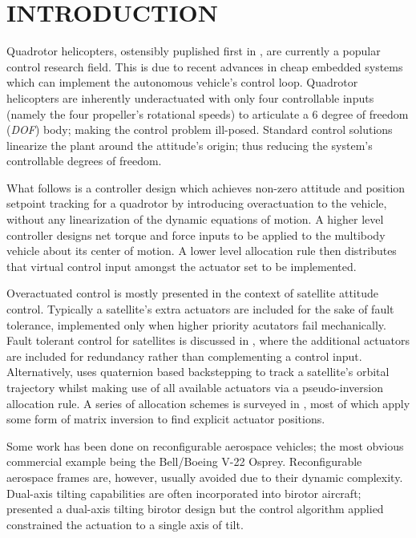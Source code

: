 \documentclass[a4paper, 10pt, conference]{ieeeconf}
\begin{document}
\section{INTRODUCTION}
Quadrotor helicopters, ostensibly puplished first in \cite{x4flyer}, are currently a popular control research field. This is due to recent advances in cheap embedded systems which can implement the autonomous vehicle's control loop. Quadrotor helicopters are inherently underactuated with only four controllable inputs (namely the four propeller's rotational speeds) to articulate a 6 degree of freedom (\emph{DOF}) body; making the control problem ill-posed. Standard control solutions linearize the plant around the attitude's origin; thus reducing the system's controllable degrees of freedom. 
\par
What follows is a controller design which achieves non-zero attitude and position setpoint tracking for a quadrotor by introducing overactuation to the vehicle, without any linearization of the dynamic equations of motion. A higher level controller designs net torque and force inputs to be applied to the multibody vehicle about its center of motion. A lower level allocation rule then distributes that virtual control input amongst the actuator set to be implemented.
\par
Overactuated control is mostly presented in the context of satellite attitude control. Typically a satellite's extra actuators are included for the sake of fault tolerance, implemented only when higher priority acutators fail mechanically. Fault tolerant control for satellites is discussed in \cite{ftcallocation}, where the additional actuators are included for redundancy rather than complementing a control input. Alternatively, \cite{quaternionbackstep} uses quaternion based backstepping to track a satellite's orbital trajectory whilst making use of all available actuators via a pseudo-inversion allocation rule. A series of allocation schemes is surveyed in \cite{allocation}, most of which apply some form of matrix inversion to find explicit actuator positions.
\par
Some work has been done on reconfigurable aerospace vehicles; the most obvious commercial example being the Bell/Boeing V-22 Osprey. Reconfigurable aerospace frames are, however, usually avoided due to their dynamic complexity. Dual-axis tilting capabilities are often incorporated into birotor aircraft; \cite{ggress} presented a dual-axis tilting birotor design but the control algorithm applied constrained the actuation to a single axis of tilt. 
\end{document}

